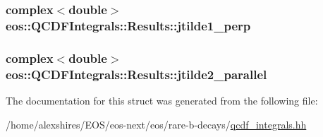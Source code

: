 \hypertarget{structeos_1_1QCDFIntegrals_1_1Results_affa81425a4a26725aec429cac18c363c}{
\subsubsection[{jtilde1\_\-perp}]{\setlength{\rightskip}{0pt plus 5cm}complex$<$double$>$ {\bf eos::QCDFIntegrals::Results::jtilde1\_\-perp}}}
\label{structeos_1_1QCDFIntegrals_1_1Results_affa81425a4a26725aec429cac18c363c}
\hypertarget{structeos_1_1QCDFIntegrals_1_1Results_ae93c8c7a9f37dfc2f2a71bf76afc78fa}{
\subsubsection[{jtilde2\_\-parallel}]{\setlength{\rightskip}{0pt plus 5cm}complex$<$double$>$ {\bf eos::QCDFIntegrals::Results::jtilde2\_\-parallel}}}
\label{structeos_1_1QCDFIntegrals_1_1Results_ae93c8c7a9f37dfc2f2a71bf76afc78fa}


The documentation for this struct was generated from the following file:\begin{DoxyCompactItemize}
\item 
/home/alexshires/EOS/eos-\/next/eos/rare-\/b-\/decays/\hyperlink{qcdf__integrals_8hh}{qcdf\_\-integrals.hh}\end{DoxyCompactItemize}
